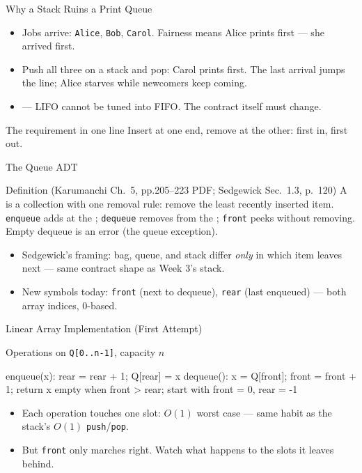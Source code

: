 \documentclass[aspectratio=169]{beamer}
\begin{document}

\begin{frame}{Why a Stack Ruins a Print Queue}
  \begin{itemize}
    \item Jobs arrive: \texttt{Alice}, \texttt{Bob}, \texttt{Carol}. Fairness
      means Alice prints first --- she arrived first.
    \item Push all three on a stack and pop: Carol prints first. The last
      arrival jumps the line; Alice starves while newcomers keep coming.
    \item {} --- LIFO cannot
      be tuned into FIFO. The contract itself must change.
  \end{itemize}
  \begin{exampleblock}{The requirement in one line}
    Insert at one end, remove at the other: first in, first out.
  \end{exampleblock}
\end{frame}

\begin{frame}{The Queue ADT}
  \begin{block}{Definition (Karumanchi Ch.~5, pp.205--223 PDF; Sedgewick
    Sec.~1.3, p.~120)
    \cite{Karumanchi2017_data_structures_algorithms_made_easy,Sedgewick2011_algorithms}}
    A  is a collection with one removal rule: remove the least
    recently inserted item. \texttt{enqueue} adds at the ;
    \texttt{dequeue} removes from the ; \texttt{front} peeks
    without removing. Empty dequeue is an error (the queue exception).
  \end{block}
  \begin{itemize}
    \item Sedgewick's framing: bag, queue, and stack differ \emph{only} in
      which item leaves next --- same contract shape as Week 3's stack.
    \item New symbols today: \texttt{front} (next to dequeue),
      \texttt{rear} (last enqueued) --- both array indices, 0-based.
  \end{itemize}
\end{frame}

\begin{frame}[fragile]{Linear Array Implementation (First Attempt)}
  \begin{block}{Operations on \texttt{Q[0..n-1]}, capacity $n$}
\begin{semiverbatim}
enqueue(x): rear = rear + 1; Q[rear] = x
dequeue():   x = Q[front]; front = front + 1; return x
empty when front > rear; start with front = 0, rear = -1
\end{semiverbatim}
  \end{block}
  \begin{itemize}
    \item Each operation touches one slot: $O(1)$ worst case --- same habit
      as the stack's $O(1)$ \texttt{push}/\texttt{pop}.
    \item But \texttt{front} only marches right. Watch what happens to the
      slots it leaves behind.
  \end{itemize}
\end{frame}
\end{document}
